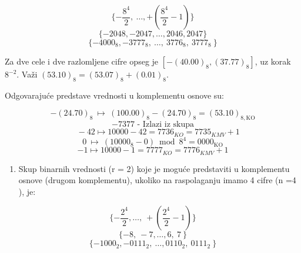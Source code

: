 \documentclass[a4paper,11pt]{article}
\numberwithin{equation}{section}
\begin{document}
\begin{equation}\label{eq:2.5.16}
\{ - \frac{8^{4}}{2},\ \ldots, + \left( \frac{8^{4}}{2} - 1 \right)\}
\end{equation}
\begin{equation}\label{eq:2.5.17}
\{-2048,-2047,\dots,2046,2047\}
\end{equation}
\begin{equation}\label{eq:2.5.18}
\{ - 4000_{8},{- 3777}_{8},\ \ldots,\ 3776_{8},\ 3777_{8}\ \}
\end{equation}

Za dve cele i dve razlomljene cifre opseg je $[-(40.00)_8,(37.77)_8]$, uz korak $8^{-2}$. Važi $(53.10)_8=(53.07)_8+(0.01)_8$.\par

Odgovarajuće predstave vrednosti u komplementu osnove su:



\begin{equation}\label{eq:2.5.19}
-(24.70)_8\ \longmapsto\ (100.00)_8-(24.70)_8=(53.10)_{8,\mathrm{KO}}
\end{equation}
\begin{equation}\label{eq:2.5.20}
\text{\(- 7377\) - Izlazi iz skupa}
\end{equation}
\begin{equation}\label{eq:2.5.21}
\ \ \ \ \ \  - 42 \longmapsto 10000 - 42 = 7736_{KO} = 7735_{KMV} + 1
\end{equation}
\begin{equation}\label{eq:2.5.22}
0\ \longmapsto\ (10000_8-0)\bmod8^4=0000_{\mathrm{KO}}
\end{equation}
\begin{equation}\label{eq:2.5.23}
-1 \longmapsto 10000 - 1 = 7777_{KO} = 7776_{KMV} + 1
\end{equation}


\begin{enumerate}[label=\alph*),start=4,leftmargin=*]
\item Skup binarnih vrednosti (r = 2) koje je moguće predstaviti u komplementu osnove (drugom komplementu), ukoliko na raspolaganju imamo 4 cifre (n =4 ), je:

\end{enumerate}


\begin{equation}\label{eq:2.5.24}
\{ - \frac{2^{4}}{2},\ldots,\  + \left( \frac{2^{4}}{2} - 1 \right)\}
\end{equation}
\begin{equation}\label{eq:2.5.25}
\{ - 8,\  - 7,\ldots,6,\ 7\ \}
\end{equation}
\begin{equation}\label{eq:2.5.26}
\{ - 1000_{2}, - 0111_{2},\ \ldots,0110_{2},\ 0111_{2}\ \}
\end{equation}
\end{document}
